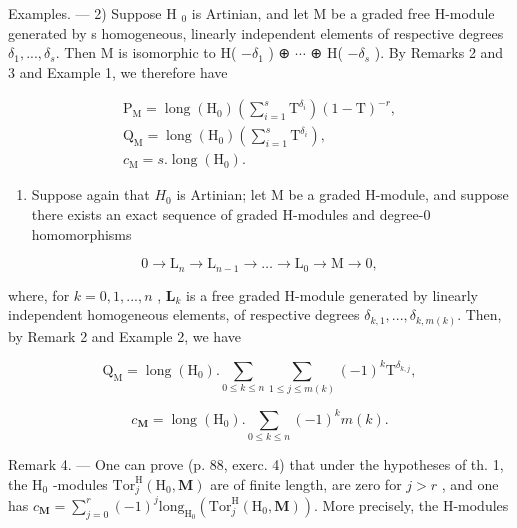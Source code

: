 Examples. --- 2) Suppose H \(_{0}\) is Artinian, and let M be a graded free H-module generated by s homogeneous, linearly independent elements of respective degrees \(\delta_{1}, ..., \delta_{s}\). Then M is isomorphic to H( \(-\delta_{1}\) ) ⊕ \(\cdots\) ⊕ H( \(-\delta_{s}\) ). By Remarks 2 and 3 and Example 1, we therefore have

\[
\begin{array}{l} \mathrm {P_ {M}} = \operatorname{long} (\mathrm {H_ {0}}) \left(\sum_ {i = 1} ^ {s} \mathrm{T} ^ {\delta_ {i}}\right) (1 - \mathrm{T}) ^ {- r}, \\ \mathrm {Q_ {M}} = \operatorname{long} (\mathrm {H_ {0}}) \left(\sum_ {i = 1} ^ {s} \mathrm{T} ^ {\delta_ {i}}\right), \\ c _ {\mathrm{M}} = s. \operatorname{long} (\mathrm {H_ {0}}). \end{array}
\]

\begin{enumerate}
\def\labelenumi{\arabic{enumi})}
\setcounter{enumi}{2}
\tightlist
\item
  Suppose again that \(H_{0}\) is Artinian; let M be a graded H-module, and suppose there exists an exact sequence of graded H-modules and degree-0 homomorphisms
\end{enumerate}

\[
0 \to \mathrm{L} _ {n} \to \mathrm{L} _ {n - 1} \to \dots \to \mathrm{L} _ {0} \to \mathrm{M} \to 0,
\]

where, for \(k=0,1,...,n\) , \(\mathbf{L}_{k}\) is a free graded H-module generated by linearly independent homogeneous elements, of respective degrees \(\delta_{k,1},..., \delta_{k,m(k)}\). Then, by Remark 2 and Example 2, we have

\[
\mathrm{Q} _ {\mathrm{M}} = \operatorname{long} (\mathrm{H} _ {0}). \sum_ {0 \leqslant k \leqslant n} \sum_ {1 \leqslant j \leqslant m (k)} (- 1) ^ {k} \mathrm{T} ^ {\delta_ {k, j}},
\]

\[
c _ {\mathbf {M}} = \operatorname{long} (\mathrm{H} _ {0}). \sum_ {0 \leqslant k \leqslant n} (- 1) ^ {k} m (k).
\]

Remark 4. --- One can prove (p. 88, exerc. 4) that under the hypotheses of th. 1, the \(\mathrm{H}_{0}\) -modules \(\mathrm{Tor}_{j}^{\mathrm{H}}(\mathrm{H}_{0},\mathbf{M})\) are of finite length, are zero for \(j > r\) , and one has \(c_{\mathbf{M}} = \sum_{j=0}^{r} (-1)^{j} \mathrm{long}_{\mathrm{H}_{0}}(\mathrm{Tor}_{j}^{\mathrm{H}}(\mathrm{H}_{0},\mathbf{M}))\). More precisely, the H-modules

